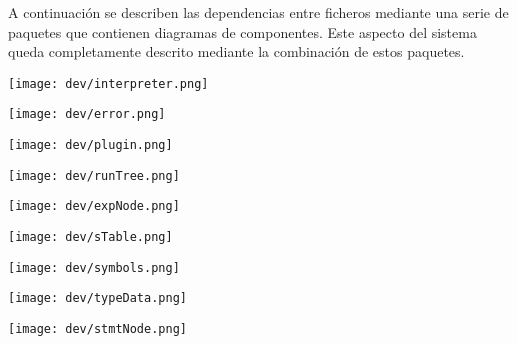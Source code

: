 A continuación se describen las dependencias entre ficheros mediante una serie de paquetes que contienen diagramas de componentes.
Este aspecto del sistema queda completamente descrito mediante la combinación de estos paquetes.

\begin{center}
\texttt{[image: dev/interpreter.png]} 
\end{center}
\pagebreak

\begin{multicols}{2}
\begin{center}
\texttt{[image: dev/error.png]} 
\end{center}
\begin{center}

\texttt{[image: dev/plugin.png]} 
\end{center}
\end{multicols}

\begin{multicols}{2}
\begin{center}
\texttt{[image: dev/runTree.png]} 
\end{center}
\begin{center}

\texttt{[image: dev/expNode.png]} 
\end{center}
\end{multicols}

\begin{multicols}{2}
\begin{center}
\texttt{[image: dev/sTable.png]} 
\end{center}
\begin{center}

\texttt{[image: dev/symbols.png]} 
\end{center}
\end{multicols}
\pagebreak

\begin{multicols}{2}
\begin{center}
\texttt{[image: dev/typeData.png]} 
\end{center}
\begin{center}

\texttt{[image: dev/stmtNode.png]} 
\end{center}
\end{multicols}


